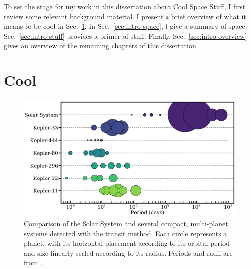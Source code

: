 
To set the stage for my work in this dissertation about Cool Space Stuff, I first review some relevant background material.
I present a brief overview of what it means to be cool in Sec.~\ref{sec:intro-cool}.
In Sec.~\ref{sec:intro-space}, I give a summary of space.
Sec.~\ref{sec:intro-stuff} provides a primer of stuff.
Finally, Sec.~\ref{sec:intro-overview} gives an overview of the remaining chapters of this dissertation.


\section{Cool}
\label{sec:intro-cool}

\lipsum[1]

\begin{figure}
  \centering
  \includegraphics[width=\linewidth]{figures/intro/compact-systems-periods-feb-2019v5.pdf}
  \caption[Examples of cool planetary systems]{Comparison of the Solar System and several compact, multi-planet systems detected with the transit method. Each circle represents a planet, with its horizontal placement according to its orbital period and size linearly scaled according to its radius. Periods and radii are from \citep{nasa-exoplanet-archive-2019}.}
  \label{fig:cool-systems}
\end{figure}

